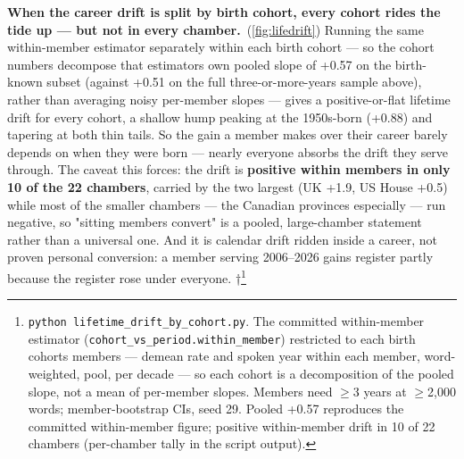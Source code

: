 \textbf{When the career drift is split by birth cohort, every cohort rides the tide up --- but not in every chamber.}~(\cref{fig:lifedrift}) Running the same within-member estimator separately within each birth cohort --- so the cohort numbers decompose that estimator\textquotesingle s own pooled slope of +0.57 on the birth-known subset (against +0.51 on the full three-or-more-years sample above), rather than averaging noisy per-member slopes --- gives a positive-or-flat lifetime drift for every cohort, a shallow hump peaking at the 1950s-born (+0.88) and tapering at both thin tails. So the gain a member makes over their career barely depends on when they were born --- nearly everyone absorbs the drift they serve through. The caveat this forces: the drift is \textbf{positive within members in only 10 of the 22 chambers}, carried by the two largest (UK +1.9, US House +0.5) while most of the smaller chambers --- the Canadian provinces especially --- run negative, so "sitting members convert" is a pooled, large-chamber statement rather than a universal one. And it is calendar drift ridden inside a career, not proven personal conversion: a member serving 2006--2026 gains register partly because the register rose under everyone. †\footnote{\texttt{python\ lifetime\_\allowbreak{}drift\_\allowbreak{}by\_\allowbreak{}cohort.\allowbreak{}py}. The committed within-member estimator (\texttt{cohort\_\allowbreak{}vs\_\allowbreak{}period.\allowbreak{}within\_\allowbreak{}member}) restricted to each birth cohort\textquotesingle s members --- demean rate and spoken year within each member, word-weighted, pool, per decade --- so each cohort is a decomposition of the pooled slope, not a mean of per-member slopes. Members need \(\geq\)3 years at \(\geq\)2,000 words; member-bootstrap CIs, seed 29. Pooled +0.57 reproduces the committed within-member figure; positive within-member drift in 10 of 22 chambers (per-chamber tally in the script output).}

